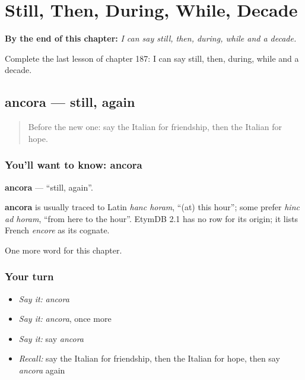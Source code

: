 
\chapter{Still, Then, During, While, Decade}
\label{ch:it-still-then-during-while-decade}

\begin{chapteropening}
\textbf{By the end of this chapter:} \emph{I can say still, then, during, while and a decade.}

Complete the last lesson of chapter 187: I can say still, then, during, while and a decade.
\end{chapteropening}

\section[ancora]{ancora — still, again}

\label{lesson:IT-C187-ancora}



\begin{quote}
Before the new one: say the Italian for friendship, then the Italian for hope.
\end{quote}

\subsection*{You'll want to know: ancora}
\textbf{ancora} — \textquotedblleft{}still, again\textquotedblright{}.

\begin{cousinweb}
\textbf{ancora} is usually traced to Latin \emph{hanc horam}, \textquotedblleft{}(at) this hour\textquotedblright{}; some prefer \emph{hinc ad horam}, \textquotedblleft{}from here to the hour\textquotedblright{}. EtymDB 2.1 has no row for its origin; it lists French \emph{encore} as its cognate.
\end{cousinweb}

\begin{grammarlens}[title={What you've built}]
One more word for this chapter.
\end{grammarlens}

\subsection*{Your turn}
\begin{itemize}
\raggedright
  \item \emph{Say it:} \emph{ancora}
  \item \emph{Say it:} \emph{ancora}, once more
  \item \emph{Say it:} say \emph{ancora}
  \item \emph{Recall:} say the Italian for friendship, then the Italian for hope, then say \emph{ancora} again
\end{itemize}

